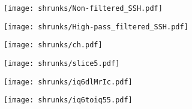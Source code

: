 \begin{frame}
\begin{figure}
	\centering
	\texttt{[image: shrunks/Non-filtered\_SSH.pdf]}
\end{figure}
\end{frame}

\begin{frame}
\begin{figure}
	\centering
	\texttt{[image: shrunks/High-pass\_filtered\_SSH.pdf]}
\end{figure}
\end{frame}

\begin{frame}
\begin{figure}
	\centering
	\texttt{[image: shrunks/ch.pdf]}
\end{figure}
\end{frame}

\begin{frame}
\begin{figure}
	\centering
	\texttt{[image: shrunks/slice5.pdf]}
\end{figure}
\end{frame}

\begin{frame}
\begin{figure}
	\centering
	\texttt{[image: shrunks/iq6dlMrIc.pdf]}
\end{figure}
\end{frame}


\begin{frame}
\begin{figure}
	\centering
	\texttt{[image: shrunks/iq6toiq55.pdf]}
\end{figure}
\end{frame}





